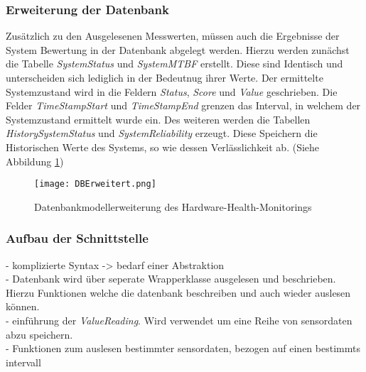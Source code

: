 \subsubsection*{Erweiterung der Datenbank}
Zusätzlich zu den Ausgelesenen Messwerten, müssen auch die Ergebnisse der System Bewertung in der Datenbank abgelegt werden. 
Hierzu werden zunächst die Tabelle \textit{SystemStatus} und \textit{SystemMTBF} erstellt. Diese sind Identisch und unterscheiden sich lediglich in der Bedeutnug ihrer Werte. Der ermittelte Systemzustand wird in die Feldern \textit{Status}, \textit{Score} und \textit{Value} geschrieben. Die Felder \textit{TimeStampStart} und \textit{TimeStampEnd} grenzen das Interval, in welchem der Systemzustand ermittelt wurde ein. Des weiteren werden die Tabellen \textit{HistorySystemStatus} und \textit{SystemReliability} erzeugt. Diese Speichern die Historischen Werte des Systems, so wie dessen Verlässlichkeit ab. (Siehe Abbildung \ref{fig:DBModellErweitert})   
\begin{center}
    \begin{figure}[h!]
        \centering
        \texttt{[image: DBErweitert.png]}
        \caption{Datenbankmodellerweiterung des Hardware-Health-Monitorings}
        \label{fig:DBModellErweitert}
    \end{figure}
\end{center}
\vspace{-1.8cm}

\subsubsection*{Aufbau der Schnittstelle}
- komplizierte Syntax -> bedarf einer Abstraktion\\
- Datenbank wird über seperate Wrapperklasse ausgelesen und beschrieben. Hierzu Funktionen welche die datenbank beschreiben und auch wieder auslesen können. \\
- einführung der \textit{ValueReading}. Wird verwendet um eine Reihe von sensordaten abzu speichern. \\
- Funktionen zum auslesen bestimmter sensordaten, bezogen auf einen bestimmts intervall\\




















